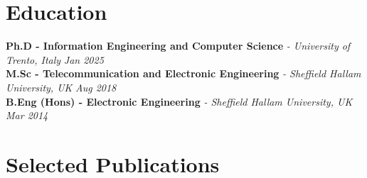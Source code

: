 \documentclass[11pt]{article}
\begin{document}
\section*{Education}
\noindent\textbf{Ph.D - Information Engineering and Computer Science} \textit{\small{ - University of Trento, Italy}} \hfill \textit{Jan 2025}\\[2pt]
\noindent\textbf{M.Sc - Telecommunication and Electronic Engineering} \textit{\small{ - Sheffield Hallam University, UK}} \hfill \textit{Aug 2018}\\[2pt]
\noindent\textbf{B.Eng (Hons) - Electronic Engineering} \textit{\small{ - Sheffield Hallam University, UK}} \hfill \textit{Mar 2014}

\newpage
\section*{Selected Publications \footnotesize {}}
\end{document}
